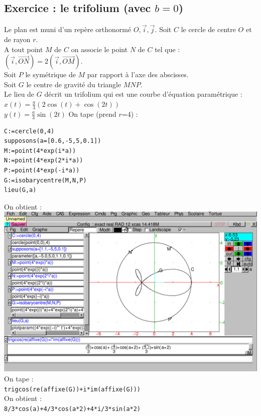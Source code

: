 \documentclass[a4paper,11pt]{book}
\begin{document}
\subsection{Exercice : le trifolium (avec $b=0$)}
Le plan est muni d'un rep\`ere orthonorm\'e $O,\overrightarrow{i},\overrightarrow{j}$. Soit $C$ le cercle de centre $O$ et de rayon $r$.\\
A tout point $M$ de $C$ on associe le point $N$ de $C$ tel que :\\
$(\overrightarrow{i},\overrightarrow{ON})=2(\overrightarrow{i},\overrightarrow{OM})$.\\
Soit $P$ le sym\'etrique de $M$ par rapport \`a l'axe des abscisses.\\
Soit $G$ le centre de gravit\'e du triangle $MNP$.\\
Le lieu de $G$ d\'ecrit un trifolium qui est une courbe d'\'equation 
param\'etrique  :\\
$x(t)=\displaystyle \frac{a}{3}(2\cos(t)+\cos(2t))$\\
$y(t)=\displaystyle \frac{a}{3}\sin(2t)$
On tape (prend $r$=4) :
\begin{verbatim}
C:=cercle(0,4)
supposons(a=[0.6,-5,5,0.1])
M:=point(4*exp(i*a))
N:=point(4*exp(2*i*a))
P:=point(4*exp(-i*a))
G:=isobarycentre(M,N,P)
lieu(G,a)
\end{verbatim}
On obtient :\\
\includegraphics[width=\textwidth]{folium}
On tape :\\
{\tt trigcos(re(affixe(G))+i*im(affixe(G)))}\\
On obtient :\\
{\tt 8/3*cos(a)+4/3*cos(a*2)+4*i/3*sin(a*2)}
\end{document}
